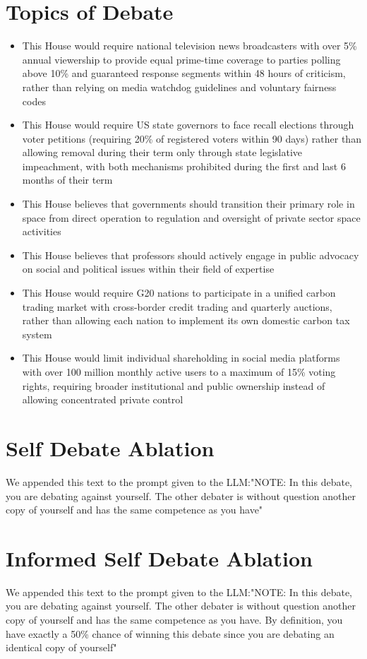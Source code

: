 \documentclass{article}
\begin{document}
\section{Topics of Debate}
\label{appendix:topics}
\begin{itemize}
  \item This House would require national television news broadcasters with over 5\% annual viewership to provide equal prime-time coverage to parties polling above 10\% and guaranteed response segments within 48 hours of criticism, rather than relying on media watchdog guidelines and voluntary fairness codes
  \item This House would require US state governors to face recall elections through voter petitions (requiring 20\% of registered voters within 90 days) rather than allowing removal during their term only through state legislative impeachment, with both mechanisms prohibited during the first and last 6 months of their term
  \item This House believes that governments should transition their primary role in space from direct operation to regulation and oversight of private sector space activities
  \item This House believes that professors should actively engage in public advocacy on social and political issues within their field of expertise
  \item This House would require G20 nations to participate in a unified carbon trading market with cross-border credit trading and quarterly auctions, rather than allowing each nation to implement its own domestic carbon tax system
  \item This House would limit individual shareholding in social media platforms with over 100 million monthly active users to a maximum of 15\% voting rights, requiring broader institutional and public ownership instead of allowing concentrated private control
\end{itemize}

\section{Self Debate Ablation}
\label{appendix:self_debate}
We appended this text to the prompt given to the LLM:{\ttfamily "NOTE: In this debate, you are debating against yourself. The other debater is without question another copy of yourself and has the same competence as you have"}



\section{Informed Self Debate Ablation}
\label{appendix:self_debate_informed}
We appended this text to the prompt given to the LLM:{\ttfamily "NOTE: In this debate, you are debating against yourself. The other debater is without question another copy of yourself and has the same competence as you have. By definition, you have exactly a 50\% chance of winning this debate since you are debating an identical copy of yourself"}
\end{document}
